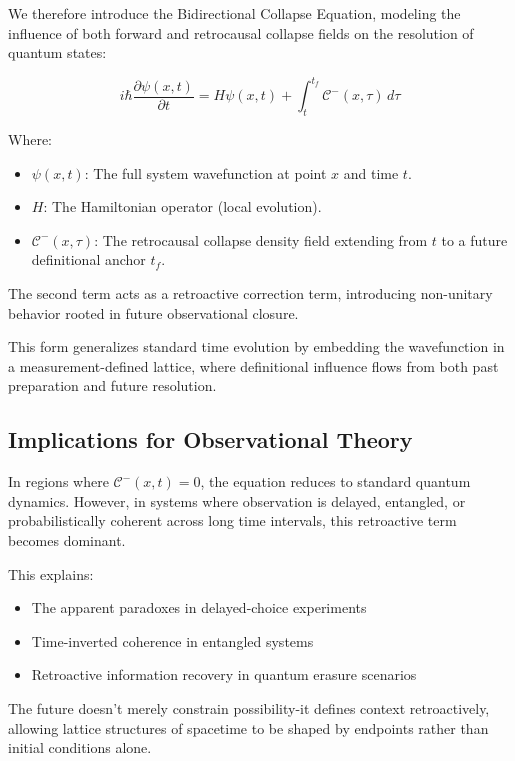 We therefore introduce the Bidirectional Collapse Equation, modeling the influence of both forward and retrocausal collapse fields on the resolution of quantum states:

\begin{equation}
i\hbar \frac{\partial \psi(x,t)}{\partial t} = H \psi(x,t) + \int_{t}^{t_f} \mathcal{C}^-(x,\tau) \, d\tau
\end{equation}

Where:
\begin{itemize}
    \item \( \psi(x,t) \): The full system wavefunction at point \( x \) and time \( t \).
    \item \( H \): The Hamiltonian operator (local evolution).
    \item \( \mathcal{C}^-(x,\tau) \): The retrocausal collapse density field extending from \( t \) to a future definitional anchor \( t_f \).
\end{itemize}

The second term acts as a retroactive correction term, introducing non-unitary behavior rooted in future observational closure.

This form generalizes standard time evolution by embedding the wavefunction in a measurement-defined lattice, where definitional influence flows from both past preparation and future resolution.

\subsection{Implications for Observational Theory}

In regions where \( \mathcal{C}^-(x,t) = 0 \), the equation reduces to standard quantum dynamics. However, in systems where observation is delayed, entangled, or probabilistically coherent across long time intervals, this retroactive term becomes dominant.

This explains:
\begin{itemize}
    \item The apparent paradoxes in delayed-choice experiments
    \item Time-inverted coherence in entangled systems
    \item Retroactive information recovery in quantum erasure scenarios
\end{itemize}

The future doesn't merely constrain possibility-it defines context retroactively, allowing lattice structures of spacetime to be shaped by endpoints rather than initial conditions alone.

